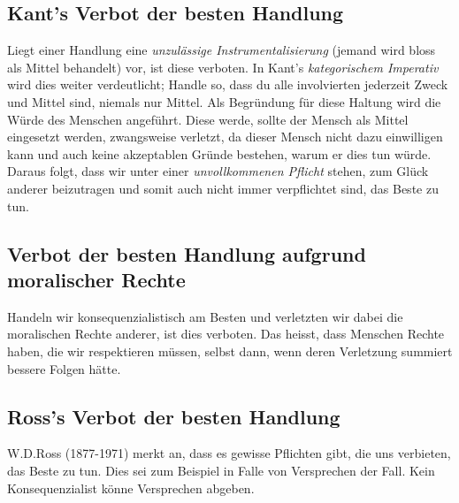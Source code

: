 \documentclass[../main.tex]{subfiles}
\begin{document}
\subsection{Kant's Verbot der besten Handlung}
Liegt einer Handlung eine \textit{unzulässige Instrumentalisierung} (jemand wird bloss als Mittel behandelt) vor, ist diese verboten. In Kant's \textit{kategorischem Imperativ} wird dies weiter verdeutlicht; Handle so, dass du alle involvierten jederzeit Zweck und Mittel sind, niemals nur Mittel. Als Begründung für diese Haltung wird die Würde des Menschen angeführt. Diese werde, sollte der Mensch als Mittel eingesetzt werden, zwangsweise verletzt, da dieser Mensch nicht dazu einwilligen kann und auch keine akzeptablen Gründe bestehen, warum er dies tun würde. Daraus folgt, dass wir unter einer \textit{unvollkommenen Pflicht} stehen, zum Glück anderer beizutragen und somit auch nicht immer verpflichtet sind, das Beste zu tun. 

\subsection{Verbot der besten Handlung aufgrund moralischer Rechte}
Handeln wir konsequenzialistisch am Besten und verletzten wir dabei die moralischen Rechte anderer, ist dies verboten. Das heisst, dass Menschen Rechte haben, die wir respektieren müssen, selbst dann, wenn deren Verletzung summiert bessere Folgen hätte. 

\subsection{Ross's Verbot der besten Handlung}
W.D.Ross (1877-1971) merkt an, dass es gewisse Pflichten gibt, die uns verbieten, das Beste zu tun. Dies sei zum Beispiel in Falle von Versprechen der Fall. Kein Konsequenzialist könne Versprechen abgeben.
\end{document}
